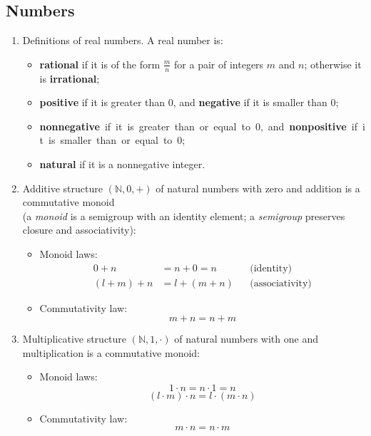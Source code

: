 \documentclass{article}
\begin{document}
\subsection{Numbers}
\begin{enumerate}
    \item Definitions of real numbers. A real number is:
        \begin{itemize}[topsep=0pt]
            \item \textbf{rational} if it is of the form $\frac{m}{n}$ for a pair of integers $m$ and $n$; otherwise it is \textbf{irrational};
            \item \textbf{positive} if it is greater than 0, and \textbf{negative} if it is smaller than 0;
            \item \textbf{nonnegative}~if~it~is~greater~than~or~equal~to~0,~and~\textbf{nonpositive}~if~it~is~smaller~than~or~equal~to~0;
            \item \textbf{natural} if it is a nonnegative integer.
        \end{itemize}
    \item Additive structure $(\mathbb{N},0,+)$ of natural numbers with zero and addition is a commutative monoid\\(a \textit{monoid} is a semigroup with an identity element; a \textit{semigroup} preserves closure and associativity):
        \begin{itemize}[topsep=0pt]
            \item Monoid laws:
                $$\begin{aligned}
                	0+n&=n+0=n&&\text{(identity)} \\
                	(l+m)+n&=l+(m+n)&&\text{(associativity)}
                \end{aligned}$$
            \item Commutativity law:
                $$m+n=n+m$$
        \end{itemize}
    \item Multiplicative structure $(\mathbb{N},1,\cdot)$ of natural numbers with one and multiplication is a commutative monoid:
        \begin{itemize}[topsep=0pt]
            \item Monoid laws:
                $$1\cdot n=n\cdot 1=n$$
                $$(l\cdot m)\cdot n=l\cdot(m\cdot n)$$
            \item Commutativity law:
                $$m\cdot n=n\cdot m$$
        \end{itemize}

\end{enumerate}
\end{document}
